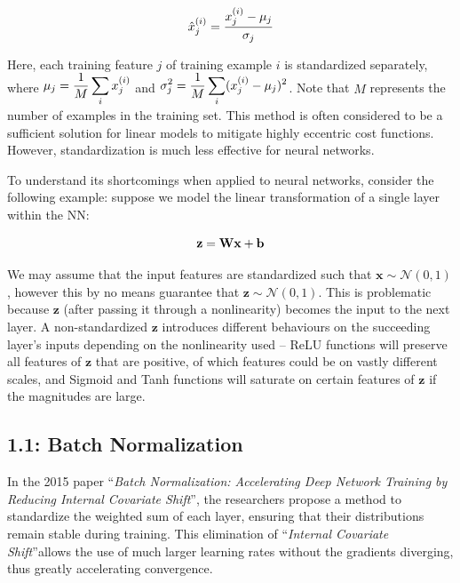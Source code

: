 \documentclass{article}
\begin{document}
\begin{multicols*}{2}
\begin{equation}
    \hat{x}_j^{(i)} = {x^{(i)}_j - \mu_j \over \sigma_j} \notag
\end{equation}

Here, each training feature $j$ of training example $i$ is standardized separately, 
where $\begin{aligned}
    \mu_j = {1\over M}\sum_i x^{(i)}_j
\end{aligned}$ and $\begin{aligned}
    \sigma^2_j = {1\over M}\sum_i (x^{(i)}_j - \mu_j)^2
\end{aligned}$. Note that $M$ represents the number of examples in the 
training set. This method is often considered to be a sufficient solution 
for linear models to mitigate highly eccentric cost functions. However, 
standardization is much less effective for neural networks.

To understand its shortcomings when applied to neural networks, consider
the following example: suppose we model the linear transformation 
of a single layer within the NN:

\begin{equation}
    \textbf{z} = \textbf{Wx} + \textbf{b} \notag
\end{equation}

We may assume that the input features are standardized such that $\textbf{x} \sim \mathcal{N}(0, 1)$, 
however this by no means guarantee that $\textbf{z} \sim \mathcal{N}(0, 1)$. This is problematic because 
$\textbf{z}$ (after passing it through a nonlinearity) becomes the input to
the next layer. A non-standardized $\textbf{z}$ introduces different
behaviours on the succeeding layer's inputs depending on the nonlinearity 
used -- ReLU functions will preserve all features of $\textbf{z}$ that are positive,
of which features could be on vastly different scales,
and Sigmoid and Tanh functions will saturate on certain features of $\textbf{z}$
if the magnitudes are large.










\subsection*{1.1: Batch Normalization}
In the 2015 paper ``\textit{Batch Normalization: Accelerating Deep Network Training 
by Reducing Internal Covariate Shift}''\cite{batchnorm}, the researchers
propose a method to standardize the weighted sum of each layer, ensuring that their
distributions remain stable during training. This elimination of ``\textit{Internal Covariate Shift}''allows the use of much larger learning
rates without the gradients diverging, thus greatly accelerating convergence.


\end{multicols*}
\end{document}
